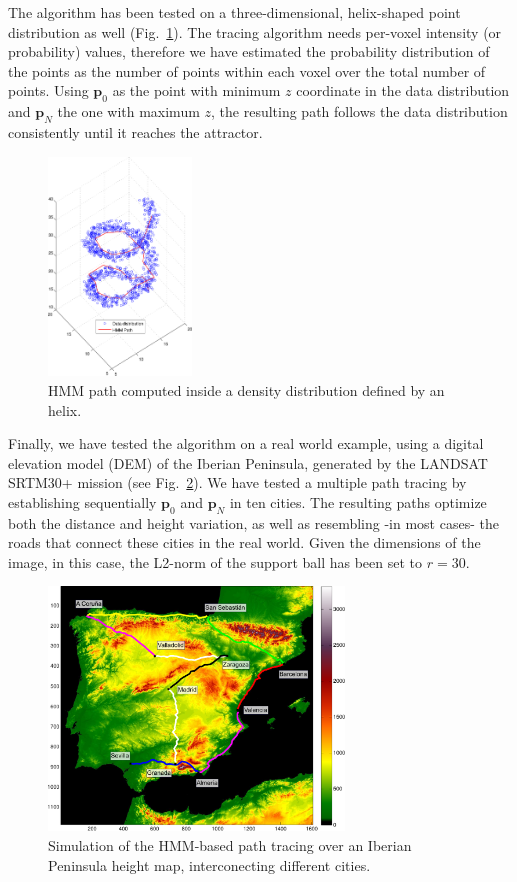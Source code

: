 The algorithm has been tested on a three-dimensional, helix-shaped point distribution as well (Fig.~\ref{fig:spire}). The tracing algorithm needs per-voxel intensity (or probability) values, therefore we have estimated the probability distribution of the points as the number of points within each voxel over the total number of points. Using $\mathbf{p}_0$ as the point with minimum $z$ coordinate in the data distribution and $\mathbf{p}_N$ the one with maximum $z$, the resulting path follows the data distribution consistently until it reaches the attractor. 
\begin{figure}
	\begin{center}
		\includegraphics[width=1.5in]{Graphics/ch6/spire}
		\caption{\ac{HMM} path computed inside a density distribution defined by an helix.}
		\label{fig:spire}
	\end{center}
\end{figure}

Finally, we have tested the algorithm on a real world example, using a digital elevation model (DEM) of the Iberian Peninsula, generated by the LANDSAT SRTM30+ mission (see Fig.~\ref{fig:spainmap}). We have tested a multiple path tracing by establishing sequentially $\mathbf{p}_0$ and $\mathbf{p}_N$ in ten cities. The resulting paths optimize both the distance and height variation, as well as resembling -in most cases- the roads that connect these cities in the real world. Given the dimensions of the image, in this case, the L2-norm of the support ball has been set to $r=30$. 

\begin{figure}[htp]
	\centering
	\includegraphics[width=0.7\textwidth]{Graphics/ch6/spain.pdf}
	\caption{Simulation of the \ac{HMM}-based path tracing over an Iberian Peninsula height map, interconecting different cities.}
	\label{fig:spainmap}
\end{figure}


